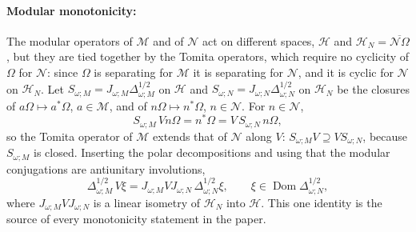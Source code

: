 \documentclass[a4paper,11pt]{article}
\theoremstyle{definition}
\begin{document}
\paragraph{Modular monotonicity:}
The modular operators of $\mathcal M$ and of $\mathcal N$ act on different spaces, $\mathcal H$ and $\mathcal H_N=\overline{\mathcal N\Omega}$, but they are tied together by the Tomita operators, which require no cyclicity of $\Omega$ for $\mathcal N$: since $\Omega$ is separating for $\mathcal M$ it is separating for $\mathcal N$, and it is cyclic for $\mathcal N$ on $\mathcal H_N$. Let $S_{\omega;M}=J_{\omega;M}\Delta_{\omega;M}^{1/2}$ on $\mathcal H$ and $S_{\omega;N}=J_{\omega;N}\Delta_{\omega;N}^{1/2}$ on $\mathcal H_N$ be the closures of $a\Omega\mapsto a^*\Omega$, $a\in\mathcal M$, and of $n\Omega\mapsto n^*\Omega$, $n\in\mathcal N$. For $n\in\mathcal N$,
\begin{equation}
  S_{\omega;M}\,Vn\Omega=n^*\Omega=V\,S_{\omega;N}\,n\Omega ,
  \label{eq:Tomita-extension}
\end{equation}
so the Tomita operator of $\mathcal M$ extends that of $\mathcal N$ along $V$: $S_{\omega;M}V\supseteq VS_{\omega;N}$, because $S_{\omega;M}$ is closed. Inserting the polar decompositions and using that the modular conjugations are antiunitary involutions,
\begin{equation}
  \Delta_{\omega;M}^{1/2}\,V\xi=J_{\omega;M}VJ_{\omega;N}\,\Delta_{\omega;N}^{1/2}\xi ,
  \qquad \xi\in\operatorname{Dom}\Delta_{\omega;N}^{1/2},
  \label{eq:modular-extension}
\end{equation}
where $J_{\omega;M}VJ_{\omega;N}$ is a linear isometry of $\mathcal H_N$ into $\mathcal H$. This one identity is the source of every monotonicity statement in the paper.
\end{document}

